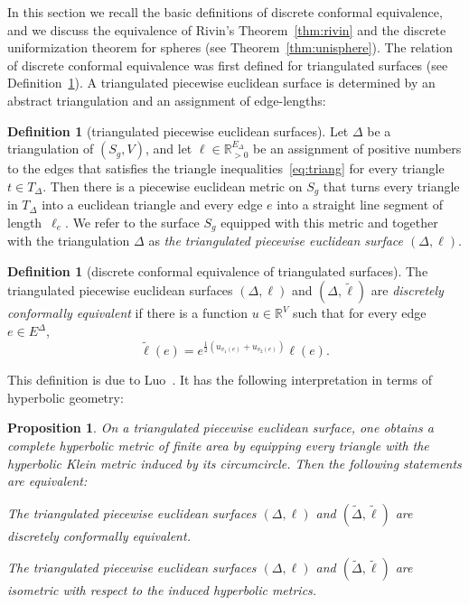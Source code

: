 \documentclass[a4paper, 11pt]{article}
\newcommand{\R}{\mathbb{R}}
\newcommand{\Deltil}{\widetilde{\Delta}}
\newcommand{\elltil}{\tilde{\ell}}
\theoremstyle{plain}
\newtheorem{proposition}[theorem]{Proposition}
\theoremstyle{definition}
\newtheorem{definition}[theorem]{Definition}
\begin{document}
In this section we recall the basic definitions of discrete conformal
equivalence, and we discuss the equivalence of Rivin's
Theorem~\ref{thm:rivin} and the discrete uniformization theorem for
spheres (see Theorem~\ref{thm:unisphere}). The relation of discrete
conformal equivalence was first defined for triangulated surfaces
(see Definition~\ref{def:dce1}). A triangulated piecewise euclidean
surface is determined by an abstract triangulation and an assignment
of edge-lengths:

\begin{definition}[triangulated piecewise euclidean surfaces]
  \label{def:dce1}
  Let $\Delta$ be a triangulation of $(S_{g},V)$, and let
  $\ell\in \R_{>0}^{E_{\Delta}}$ be an assignment of positive numbers
  to the edges that satisfies the triangle
  inequalities~\eqref{eq:triang} for every triangle $t\in T_{\Delta}$.
  Then there is a piecewise euclidean metric on $S_{g}$ that turns
  every triangle in $T_{\Delta}$ into a euclidean triangle and every
  edge $e$ into a straight line segment of length~$\ell_{e}$. We refer
  to the surface $S_{g}$ equipped with this metric and together with
  the triangulation $\Delta$ as \emph{the triangulated piecewise
    euclidean surface $(\Delta,\ell)$}.
\end{definition}

\begin{definition}[discrete conformal equivalence of triangulated
  surfaces]
  The triangulated piecewise euclidean surfaces $(\Delta,\ell)$ and
  $(\Delta,\elltil)$ are \emph{discretely conformally equivalent} if
  there is a function $u\in\R^{V}$ such that for every edge
  $e\in E^{\Delta}$,
  \begin{equation}
    \label{eq:udc}
    \elltil(e)
    =e^{\frac{1}{2}(u_{v_{1}(e)}+u_{v_{2}(e)})}\ell(e).
  \end{equation}
\end{definition}

This definition is due to Luo~\cite{luo04}. It has the following
interpretation in terms of hyperbolic geometry:

\begin{proposition}
  \label{prop:dcehyp}
  On a triangulated piecewise euclidean surface, one obtains a
  complete hyperbolic metric of finite area by equipping every
  triangle with the hyperbolic Klein metric induced by its
  circumcircle. Then the following statements are equivalent:
  \begin{compactenum}[(i)]
  \item The triangulated piecewise euclidean surfaces $(\Delta,\ell)$
    and $(\Deltil,\elltil)$ are discretely conformally equivalent.
  \item The triangulated piecewise euclidean surfaces $(\Delta,\ell)$
    and $(\Deltil,\elltil)$ are isometric with respect to the
    induced hyperbolic metrics.
  \end{compactenum}
\end{proposition}
\end{document}
